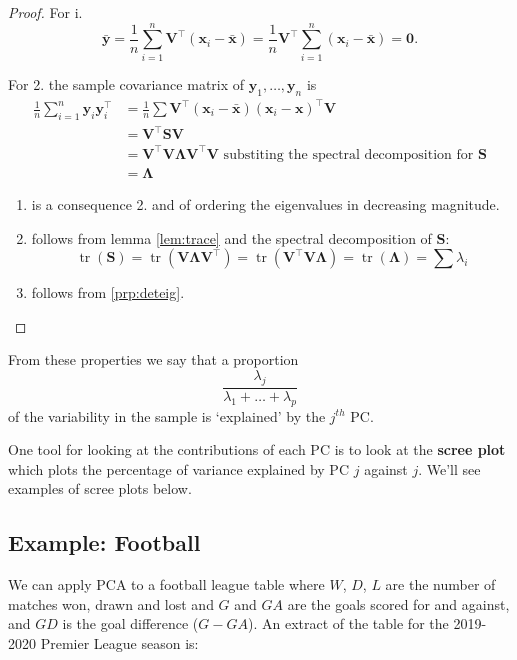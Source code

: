 \documentclass[
]{book}
\theoremstyle{definition}
\theoremstyle{definition}
\theoremstyle{definition}
\theoremstyle{definition}
\theoremstyle{remark}
\begin{document}
\begin{proof}

For i.
\[\bar{\mathbf y} = \frac{1}{n}\sum_{i=1}^n \mathbf V^\top(\mathbf x_i-\bar{\mathbf x}) = \frac{1}{n} \mathbf V^\top\sum_{i=1}^n(\mathbf x_i-\bar{\mathbf x}) ={\boldsymbol 0}.\]

For 2. the sample covariance matrix of \(\mathbf y_1, \ldots, \mathbf y_n\) is
\begin{align*}
\frac{1}{n}\sum_{i=1}^n \mathbf y_i \mathbf y_i^\top &=\frac{1}{n} \sum \mathbf V^\top (\mathbf x_i-\bar{\mathbf x})(\mathbf x_i - \mathbf x)^\top \mathbf V\\
&=\mathbf V^\top \mathbf S\mathbf V\\
&=\mathbf V^\top \mathbf V\boldsymbol \Lambda\mathbf V^\top \mathbf V\mbox{ substiting the spectral decomposition for }\mathbf S\\
&=\boldsymbol \Lambda
\end{align*}

\begin{enumerate}
\def\labelenumi{\arabic{enumi}.}
\setcounter{enumi}{2}
\item
  is a consequence 2. and of ordering the eigenvalues in decreasing magnitude.
\item
  follows from lemma \ref{lem:trace} and the spectral decomposition of \(\mathbf S\):
  \[\operatorname{tr}(\mathbf S) = \operatorname{tr}(\mathbf V\boldsymbol \Lambda\mathbf V^\top)  =\operatorname{tr}(\mathbf V^\top \mathbf V\boldsymbol \Lambda)=\operatorname{tr}(\boldsymbol \Lambda)=\sum\lambda_i\]
\item
  follows from \ref{prp:deteig}.
\end{enumerate}

\end{proof}

From these properties we say that a proportion
\[\frac{\lambda_j}{\lambda_1 + \ldots + \lambda_p}\]
of the variability in the sample is `explained' by the \(j^{th}\) PC.

One tool for looking at the contributions of each PC is to look at the \textbf{scree plot} which plots the percentage of variance explained by PC \(j\) against \(j\). We'll see examples of scree plots below.

\subsection{Example: Football}\label{pca:football}

We can apply PCA to a football league table where \(W\), \(D\), \(L\) are the number of matches won, drawn and lost and \(G\) and \(GA\) are the goals scored for and against, and \(GD\) is the goal difference (\(G-GA\)). An extract of the table for the 2019-2020 Premier League season is:
\end{document}
